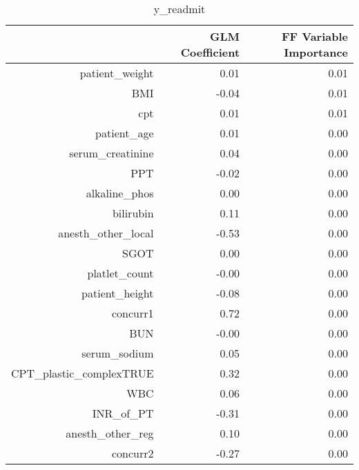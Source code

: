 \begin{table}[ht]
\centering
\begin{tabular}{rrr}
  \hline
 & GLM Coefficient & FF Variable Importance \\ 
  \hline
patient\_weight & 0.01 & 0.01 \\ 
  BMI & -0.04 & 0.01 \\ 
  cpt & 0.01 & 0.01 \\ 
  patient\_age & 0.01 & 0.00 \\ 
  serum\_creatinine & 0.04 & 0.00 \\ 
  PPT & -0.02 & 0.00 \\ 
  alkaline\_phos & 0.00 & 0.00 \\ 
  bilirubin & 0.11 & 0.00 \\ 
  anesth\_other\_local & -0.53 & 0.00 \\ 
  SGOT & 0.00 & 0.00 \\ 
  platlet\_count & -0.00 & 0.00 \\ 
  patient\_height & -0.08 & 0.00 \\ 
  concurr1 & 0.72 & 0.00 \\ 
  BUN & -0.00 & 0.00 \\ 
  serum\_sodium & 0.05 & 0.00 \\ 
  CPT\_plastic\_complexTRUE & 0.32 & 0.00 \\ 
  WBC & 0.06 & 0.00 \\ 
  INR\_of\_PT & -0.31 & 0.00 \\ 
  anesth\_other\_reg & 0.10 & 0.00 \\ 
  concurr2 & -0.27 & 0.00 \\ 
   \hline
\end{tabular}
\caption{y_readmit} 
\end{table}

